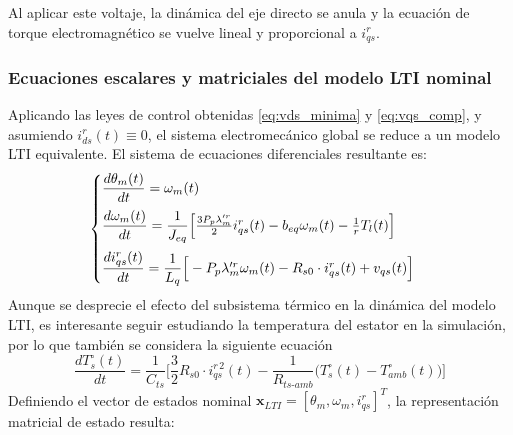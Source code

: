 \documentclass[12pt, a4paper,journal, onecolumn, compsoc]{IEEEtran}
\begin{document}
Al aplicar este voltaje, la dinámica del eje directo se anula y la ecuación de torque electromagnético se vuelve lineal y proporcional a $i_{qs}^r$.

\subsubsection{Ecuaciones escalares y matriciales del modelo LTI nominal}
Aplicando las leyes de control obtenidas \eqref{eq:vds_minima} y \eqref{eq:vqs_comp}, y asumiendo $i_{ds}^r(t) \equiv 0$, el sistema electromecánico global se reduce a un modelo LTI equivalente. El sistema de ecuaciones diferenciales resultante es:
\begin{equation} \label{eq:sis_escalar_LTI}
\begin{cases}
    \vspace{0.2cm}
    \dfrac{d\theta_m(t)}{dt} = \omega_m(t) \\
    \vspace{0.2cm}
    \dfrac{d\omega_m(t)}{dt} = \dfrac{1}{J_{eq}}\Big[\frac{3 P_p \lambda'^r_m}{2} i_{qs}^r(t) - b_{eq} \omega_m(t) - \frac{1}{r} T_l(t)\Big] \\
    \dfrac{di_{qs}^r(t)}{dt} = \dfrac{1}{L_q}\Big[-P_p \lambda'^r_m \omega_m(t) - R_{s0}\cdot i_{qs}^r(t) + v_{qs}(t)\Big]
\end{cases}
\end{equation}
Aunque se desprecie el efecto del subsistema térmico en la dinámica del modelo LTI, es interesante seguir estudiando la temperatura del estator en la simulación, por lo que también se considera la siguiente ecuación
\[\dfrac{dT_s^\circ(t)}{dt} = \dfrac{1}{C_{ts}}\Big[\frac{3}{2}R_{s0}\cdot i_{qs}^{r\,2}(t)-\frac{1}{R_{ts\text{-}amb}}\big(T_s^\circ(t) - T_{amb}^\circ(t)\big)\Big]\]
Definiendo el vector de estados nominal $\mathbf{x}_{LTI} = [\theta_m, \omega_m, i_{qs}^r]^T$, la representación matricial de estado resulta:
\end{document}
